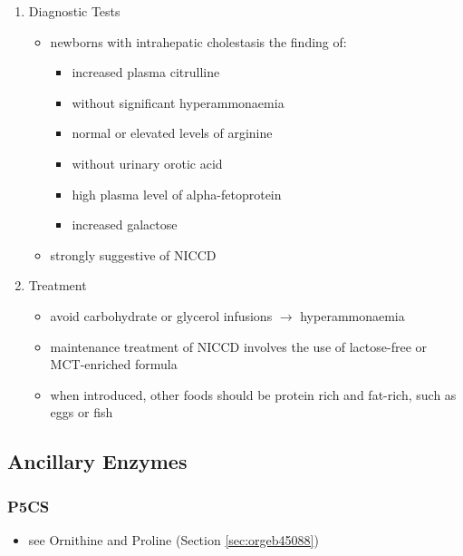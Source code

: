 \documentclass[12pt]{scrartcl}
\begin{document}
\begin{center}
\begin{center}
\begin{enumerate}
\item Diagnostic Tests
\label{sec:orgef16b93}
\begin{itemize}
\item newborns with intrahepatic cholestasis the finding of:
\begin{itemize}
\item increased plasma citrulline
\item without significant hyperammonaemia
\item normal or elevated levels of arginine
\item without urinary orotic acid
\item high plasma level of alpha-fetoprotein
\item \textpm{} increased galactose
\end{itemize}
\item strongly suggestive of  NICCD
\end{itemize}

\item Treatment
\label{sec:org6e65ebf}
\begin{itemize}
\item avoid carbohydrate or glycerol infusions \(\to\) hyperammonaemia
\item maintenance treatment of NICCD involves the use of lactose-free or
MCT-enriched formula
\item when introduced, other foods should be protein rich and fat-rich,
such as eggs or fish
\end{itemize}
\end{enumerate}
\subsection{Ancillary Enzymes}
\label{sec:org0776c51}
\subsubsection{P5CS}
\label{sec:org5d8fbf4}
\begin{itemize}
\item see Ornithine and Proline (Section \ref{sec:orgeb45088})
\end{itemize}

\end{center}
\end{center}
\end{document}
